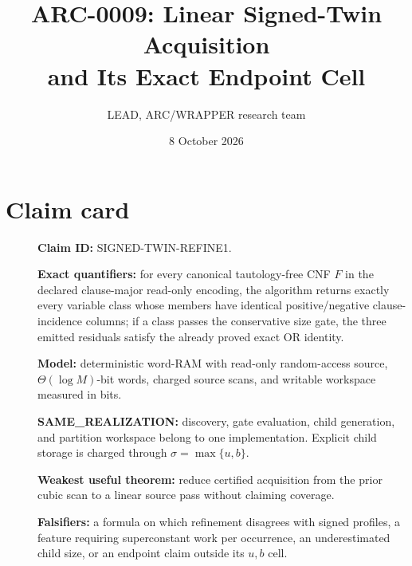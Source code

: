 \documentclass[11pt]{article}
\title{ARC-0009: Linear Signed-Twin Acquisition\\and Its Exact Endpoint Cell}
\author{LEAD, ARC/WRAPPER research team}
\date{8 October 2026}
\begin{document}
\maketitle

\begin{center}
\end{center}

\section{Claim card}
\begin{description}
\item[] \textbf{Claim ID:} SIGNED-TWIN-REFINE1.
\item[] \textbf{Exact quantifiers:} for every canonical tautology-free CNF
$F$ in the declared clause-major read-only encoding, the algorithm returns
exactly every variable class whose members have identical positive/negative
clause-incidence columns; if a class passes the conservative size gate, the
three emitted residuals satisfy the already proved exact OR identity.
\item[] \textbf{Model:} deterministic word-RAM with read-only random-access
source, $\Theta(\log M)$-bit words, charged source scans, and writable
workspace measured in bits.
\item[] \textbf{SAME\_REALIZATION:} discovery, gate evaluation, child
generation, and partition workspace belong to one implementation.  Explicit
child storage is charged through $\sigma=\max\{u,b\}$.
\item[] \textbf{Weakest useful theorem:} reduce certified acquisition from
the prior cubic scan to a linear source pass without claiming coverage.
\item[] \textbf{Falsifiers:} a formula on which refinement disagrees with
signed profiles, a feature requiring superconstant work per occurrence, an
underestimated child size, or an endpoint claim outside its $u,b$ cell.
\end{description}
\end{document}
